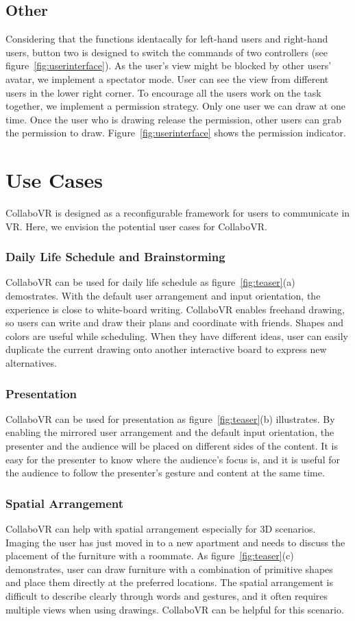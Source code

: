 \documentclass{sigchi}
\begin{document}
\subsection{Other}
Considering that the functions identacally for left-hand users and right-hand users, button two is designed to switch the commands of two controllers (see figure~\ref{fig:userinterface}). As the user's view might be blocked by other users' avatar, we implement a spectator mode. User can see the view from different users in the lower right corner. To encourage all the users work on the task together, we implement a permission strategy. Only one user we can draw at one time. Once the user who is drawing release the permission, other users can grab the permission to draw. Figure~\ref{fig:userinterface} shows the permission indicator.

\section{Use Cases}
CollaboVR is designed as a reconfigurable framework for users to communicate in VR. Here, we envision the potential user cases for CollaboVR.

\subsubsection{Daily Life Schedule and Brainstorming}
CollaboVR can be used for daily life schedule as figure~\ref{fig:teaser}(a) demostrates. With the default user arrangement and input orientation, the experience is close to white-board writing. CollaboVR enables freehand drawing, so users can write and draw their plans and coordinate with friends. Shapes and colors are useful while scheduling. When they have different ideas, user can easily duplicate the current drawing onto another interactive board to express new alternatives.

\subsubsection{Presentation}
CollaboVR can be used for presentation as figure~\ref{fig:teaser}(b) illustrates. By enabling the mirrored user arrangement and the default input orientation, the presenter and the audience will be placed on different sides of the content. It is easy for the presenter to know where the audience's focus is, and it is useful for the audience to follow the presenter's gesture and content at the same time.

\subsubsection{Spatial Arrangement}
CollaboVR can help with spatial arrangement especially for 3D scenarios. Imaging the user has just moved in to a new apartment and needs to discuss the placement of the furniture with a roommate. As figure~\ref{fig:teaser}(c) demonstrates, user can draw furniture with a combination of primitive shapes and place them directly at the preferred locations. The spatial arrangement is difficult to describe clearly through words and gestures, and it often requires multiple views when using drawings. CollaboVR can be helpful for this scenario.
\end{document}
